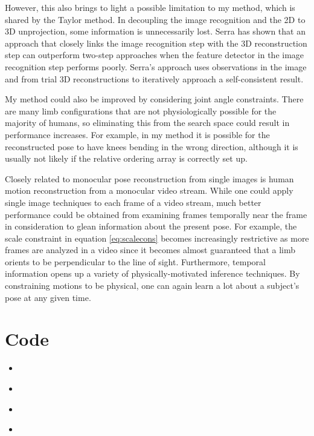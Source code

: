 \documentclass[final]{article}
\newcommand{\pythonscript}[2]{
\begin{itemize}
\item[]
\end{itemize}
}
\begin{document}
\begin{spacing}{1.1}
However, this also brings to light a possible limitation to my method, which is shared by the Taylor method. In decoupling the image recognition and the 2D to 3D unprojection, some information is unnecessarily lost. Serra has shown that an approach that closely links the image recognition step with the 3D reconstruction step can outperform two-step approaches when the feature detector in the image recognition step performs poorly\cite{Serra}. Serra's approach uses observations in the image and from trial 3D reconstructions to iteratively approach a self-consistent result. 

My method could also be improved by considering joint angle constraints. There are many limb configurations that are not physiologically possible for the majority of humans, so eliminating this from the search space could result in performance increases. For example, in my method it is possible for the reconstructed pose to have knees bending in the wrong direction, although it is usually not likely if the relative ordering array is correctly set up.

Closely related to monocular pose reconstruction from single images is human motion reconstruction from a monocular video stream. While one could apply single image techniques to each frame of a video stream, much better performance could be obtained from examining frames temporally near the frame in consideration to glean information about the present pose. For example, the scale constraint in equation \ref{eq:scalecons} becomes increasingly restrictive as more frames are analyzed in a video since it becomes almost guaranteed that a limb orients to be perpendicular to the line of sight. Furthermore, temporal information opens up a variety of physically-motivated inference techniques. By constraining motions to be physical, one can again learn a lot about a subject's pose at any given time.




  \section{Code}
     \pythonscript{meas}{Relative limb measurements}

     \pythonscript{run}{Script to launch GUI and pose reconstruction}

     \pythonscript{gui}{Tkinter code for generating a GUI for joint selection and ordering}

     \pythonscript{pointstopos}{Taylor method implementation}


\end{spacing}
\end{document}
